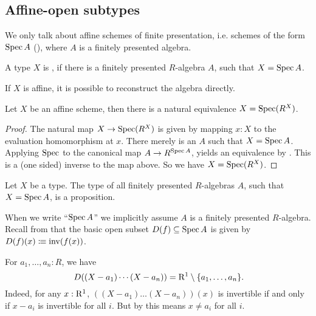 \subsection{Affine-open subtypes}

We only talk about affine schemes of finite presentation, i.e. schemes of the form $\operatorname{Spec} A$ (),
where $A$ is a finitely presented algebra.

\begin{definition}%
  A type $X$ is ,
  if there is a finitely presented $R$-algebra $A$, such that $X=\operatorname{Spec} A$.
\end{definition}

If $X$ is affine, it is possible to reconstruct the algebra directly.

\begin{lemma}%
  \label{algebra-from-affine-scheme}
  Let $X$ be an affine scheme, then there is a natural equivalence $X=\operatorname{Spec} (R^X)$.
\end{lemma}

\begin{proof}
  The natural map $X\to \operatorname{Spec} (R^X)$ is given by mapping $x:X$ to the
  evaluation homomorphism at $x$. 
  There merely is an $A$ such that $X=\operatorname{Spec} A$.
  Applying $\operatorname{Spec}$ to the canonical map $A\to R^{\operatorname{Spec} A}$,
  yields an equivalence by .
  This is a (one sided) inverse to the map above.
  So we have $X=\operatorname{Spec} (R^X)$.
\end{proof}

\begin{proposition}%
  Let $X$ be a type.
  The type of all finitely presented $R$-algebras $A$, such that $X=\operatorname{Spec} A$, is a proposition.
\end{proposition}

When we write ``$\operatorname{Spec} A$'' we implicitly assume $A$ is a finitely presented $R$-algebra.
Recall from 
that the basic open subset $D(f) \subseteq \operatorname{Spec} A$
is given by $D(f)(x)\vcentcolon\mspace{-1.2mu}\equiv \mathrm{inv}(f(x))$.

\begin{example}
  For $a_1, \dots, a_n : R$, we have
  \[ D((X - a_1) \cdots (X - a_n)) = \A^1 \setminus \{ a_1, \dots, a_n \} \rlap{.}\]
  Indeed,
  for any $x : \mathrm{R}^1$,
  $((X - a_1) \dots (X - a_n))(x)$ is invertible if and only if
  $x - a_i$ is invertible for all $i$.
  But by 
  this means $x \neq a_i$ for all $i$.
\end{example}

